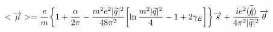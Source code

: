 \begin{equation}
<\overrightarrow{\mu}>=\frac{e}{m}\biggl\{1+\frac{\alpha}{2\pi}
-\frac{m^{2}e^{2}|\widetilde{q}|^{2} }{48\pi^{2}}
\biggl[\ln\frac{m^{2}|\widetilde{q}|^{2}}{4}-1+2\gamma_{E}\biggr]\biggr\}\overrightarrow{s}
+\frac{ie^{2}(\widetilde{q\hspace{-0.2cm}/})}{4\pi^{2}|\widetilde{q}|^{2}}\overrightarrow{\theta}
\end{equation}

